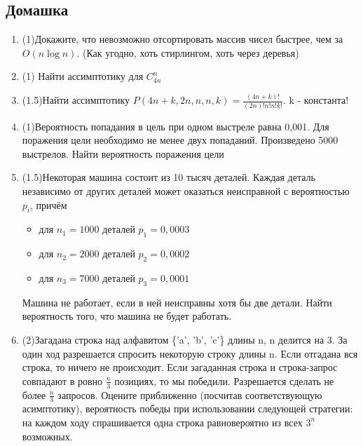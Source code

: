 \documentclass[a4paper, 14pt]{extarticle}
\begin{document}
\subsection*{Домашка}
\begin{enumerate}
\item (1)Докажите, что невозможно отсортировать массив чисел быстрее, чем за $O(n\log{n})$. (Как угодно, хоть стирлингом, хоть через деревья)
\item (1) Найти ассимптотику для $C_{4n}^{n}$
\item (1.5)Найти ассимптотику $P(4n+k,2n,n,n,k) = \frac{(4n+k)!}{(2n)!n!n!k!}$. k - константа!  
\item (1)Вероятность попадания в цель при одном выстреле равна 0,001.
Для поражения цели необходимо не менее двух попаданий. Произведено
5000 выстрелов. Найти вероятность поражения цели
\item (1.5)Некоторая машина состоит из 10 тысяч деталей. Каждая деталь независимо от других деталей может оказаться неисправной с вероятностью $p_i$, причём 
\begin{itemize}
    \item для $n_1 = 1000$ деталей $p_1 = 0,0003$
    \item для $n_2 = 2000$ деталей $p_2 = 0,0002$
    \item для $n_3 = 7000$ деталей $p_3 = 0,0001$
\end{itemize}Машина не
работает, если в ней неисправны хотя бы две детали. Найти вероятность
того, что машина не будет работать.
\item (2)Загадана строка над алфавитом \{'a', 'b', 'c'\} длины n, n делится на 3. За один ход разрешается спросить некоторую строку длины n. Если отгадана вся строка, то ничего не происходит. Если загаданная строка и строка-запрос совпадают в ровно $\frac{n}{3}$ позициях, то мы победили. Разрешается сделать не более $\frac{n}{3}$ запросов.
Оцените приближенно (посчитав соответствующую асимптотику), вероятность победы при использовании следующей стратегии: на каждом ходу спрашивается одна строка равновероятно из всех $3^n$ возможных.




\end{enumerate}
\end{document}

